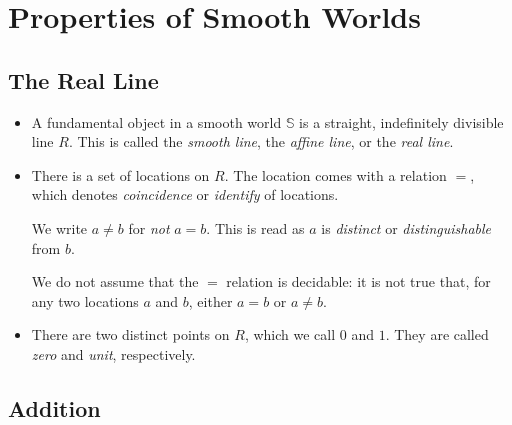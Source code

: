 \documentclass[10pt]{article}
\begin{document}
  \section{Properties of Smooth Worlds} %
  \label{sec:properties_of_a_smooth_world}
  
  \subsection{The Real Line} %
  \label{sub:the_real_line}
	\begin{itemize}
		\item A fundamental object in a smooth world $\mathbb{S}$ is a straight, indefinitely divisible line $R$. This is called the \emph{smooth line}, the \emph{affine line}, or the \emph{real line}.

		\item There is a set of locations on $R$. The location comes with a relation $=$, which denotes \emph{coincidence} or \emph{identify} of locations.

		We write $a \neq b$ for \emph{not} $a = b$. This is read as $a$ is \emph{distinct} or \emph{distinguishable} from $b$.

		We do not assume that the $=$ relation is decidable: it is not true that, for any two locations $a$ and $b$, either $a = b$ or $a \neq b$.

		\item There are two distinct points on $R$, which we call $0$ and $1$. They are called \emph{zero} and \emph{unit}, respectively.
	\end{itemize}   	

  \subsection{Addition} %
  \label{sub:addition}
\end{document}
